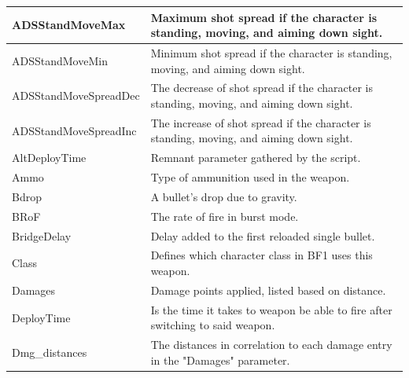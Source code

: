 \documentclass[MGS,Master,english]{twbook}%
\begin{document}
\begin{longtable}[c]{|l|p{10.5cm}|}
	ADSStandMoveMax        & Maximum shot spread if the character is standing, moving, and aiming down sight.                                               \\ \hline
	ADSStandMoveMin        & Minimum shot spread if the character is standing, moving, and aiming down sight.                                               \\ \hline
	ADSStandMoveSpreadDec  & The decrease of shot spread if the character is standing, moving, and aiming down sight.                                       \\ \hline
	ADSStandMoveSpreadInc  & The increase of shot spread if the character is standing, moving, and aiming down sight.                                       \\ \hline
	AltDeployTime          & Remnant parameter gathered by the script.                                                                                      \\ \hline
	Ammo                   & Type of ammunition used in the weapon.                                                                                         \\ \hline
	Bdrop                  & A bullet's drop due to gravity.                                                                                                \\ \hline
	BRoF                   & The rate of fire in burst mode.                                                                                                \\ \hline
	BridgeDelay            & Delay added to the first reloaded single bullet.                                                                               \\ \hline
	Class                  & Defines which character class in \ac{BF1} uses this weapon.                                                               \\ \hline
	Damages                & Damage points applied, listed based on distance.                                                                               \\ \hline
	DeployTime             & Is the time it takes to weapon be able to fire after switching to said weapon.                                                 \\ \hline
	Dmg\_distances         & The distances in correlation to each damage entry in the "Damages" parameter.                                                  \\ \hline

\end{longtable}
\end{document}

